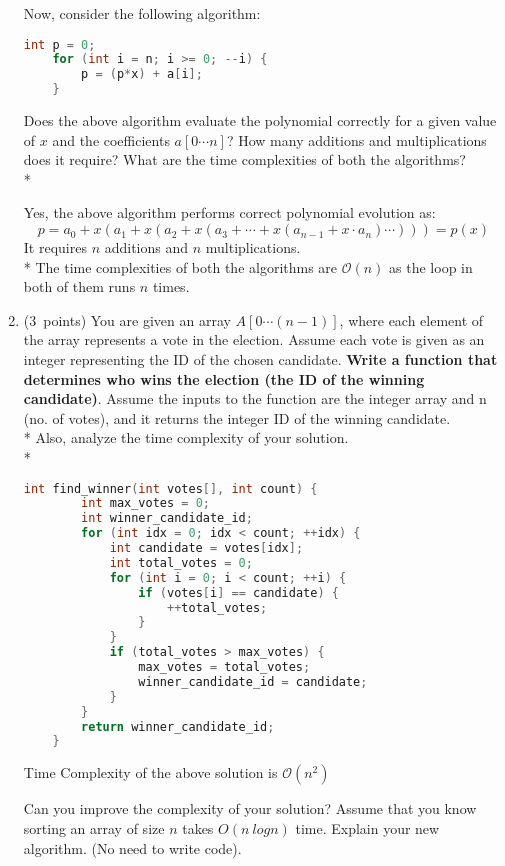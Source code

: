 \documentclass[14pt]{article}
\begin{document}
\begin{enumerate}[label=\alph*)]
    Now, consider the following algorithm:
    \begin{lstlisting}[language=C++, title={Part (c) - II}]
    int p = 0;
    for (int i = n; i >= 0; --i) {
        p = (p*x) + a[i];
    }
    \end{lstlisting}
    Does the above algorithm evaluate the polynomial correctly for a given value of $x$ and the coefficients $a[0 \cdots n]$? How many additions and multiplications does it require? What are the time complexities of both the algorithms? \\*
    \begin{myframe}[width=500pt,height=130pt,top=2pt,bottom=2.5pt,left=2pt,right=2pt,arc=10pt,auto outer arc]
    Yes, the above algorithm performs correct polynomial evolution as:
    \[ p = a_{0} + x(a_{1} + x(a_{2} + x(a_{3} + \cdots + x(a_{n-1} + x \cdot a_{n})\cdots))) = p(x)\]
    It requires $n$ additions and $n$ multiplications. \\*
    The time complexities of both the algorithms are $\mathcal{O}(n)$ as the loop in both of them runs $n$ times.
    \end{myframe}
    
    \item ($3$\ points)
    You are given an array $A[0 \cdots (n-1)]$, where each element of the array represents a vote in the election. Assume each vote is given as an integer representing the ID of the chosen candidate. \textbf{Write a function that determines who wins the election (the ID of the winning candidate)}. Assume the inputs to the function are the integer array and n (no. of votes), and it returns the integer ID of the winning candidate. \\*
    Also, analyze the time complexity of your solution. \\*
     \begin{myframe}[width=500pt,height=400pt,top=2pt,bottom=2.5pt,left=2pt,right=2pt,arc=10pt,auto outer arc]
    \begin{lstlisting}[language=C++, title={Part (b)}]
    int find_winner(int votes[], int count) {
        int max_votes = 0;
        int winner_candidate_id;
        for (int idx = 0; idx < count; ++idx) {
            int candidate = votes[idx];
            int total_votes = 0;
            for (int i = 0; i < count; ++i) {
                if (votes[i] == candidate) {
                    ++total_votes;
                }
            }
            if (total_votes > max_votes) {
                max_votes = total_votes;
                winner_candidate_id = candidate;
            }
        }
        return winner_candidate_id;
    }
    \end{lstlisting}
    Time Complexity of the above solution is $\mathcal{O}(n^2)$
    \end{myframe}
    Can you improve the complexity of your solution? Assume that you know sorting an array of size $n$ takes $O(n\ logn)$ time. Explain your new algorithm. (No need to write code).
    

\end{enumerate}
\end{document}
